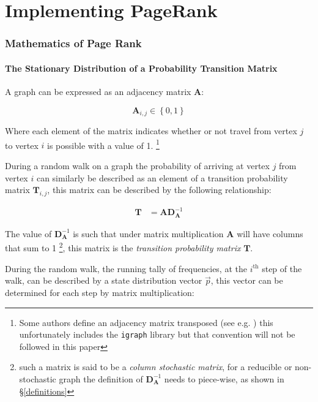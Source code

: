 \documentclass[11pt]{report}
\begin{document}
\part{Implementing PageRank}
\section{Mathematics of Page Rank}
\label{PageRank-Generally}
\cite[\S 1.1.7]{chingMarkovChainsModels2006}
\subsection{The Stationary Distribution of a Probability Transition Matrix}
\label{stationary-distribution-of-t}
A graph can be expressed as an adjacency matrix \(\mathbf{A}\):

\[
\mathbf{A}_{i,j} \in \left\{ 0,1 \right\}
\]

Where each element of the matrix indicates whether or not travel from
vertex \(j\) to vertex \(i\) is possible with a value of 1. \footnote{Some
authors define an adjacency matrix transposed (see e.g.
\cite{rosenDiscreteMathematicsIts2007,meghabghabSearchEnginesLink2008})
this unfortunately includes the \texttt{igraph} library
\cite{gaborcsardiIgraphManualPages2019} but that convention will not be
followed in this paper}

During a random walk on a graph the probability of arriving at vertex \(j\) from vertex
\(i\) can similarly be described as an element of a transition probability
matrix \(\mathbf{T}_{i,j}\), this matrix can be described by the following
relationship:

\begin{align}
\mathbf{T} &= \mathbf{A} \mathbf{D}^{-1}_{\mathbf{A}} \label{eq:basic-trans-def}
\end{align}

The value of \(\mathbf{D}^{-1}_{\mathbf{A}}\) is such that under matrix
multiplication \(\mathbf{A}\) will have columns that sum to 1 \footnote{such a matrix is said to be a \emph{column stochastic
matrix}, for a
reducible or non-stochastic graph the definition of
\(\mathbf{D}^{-1}_{\mathbf{A}}\) needs to piece-wise, as shown in \S \ref{definitions}}, this matrix is the \emph{transition probability
matrix} \(\mathbf{T}\).

During the random walk, the running tally of frequencies, at the
\(i^{\mathrm{th}}\) step of the walk, can be described by a state distribution
vector \(\vec{p}\), this vector can be determined for each step by matrix
multiplication:
\end{document}

